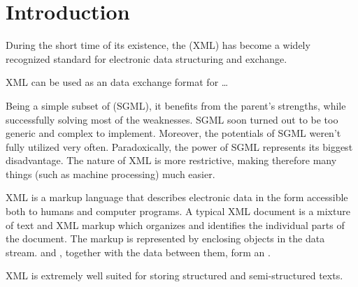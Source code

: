 \chapter{Introduction}
During the short time of its existence, the  (XML) has become a widely recognized standard for electronic data structuring and exchange.

XML can be used as an data exchange format for  \dots

Being a simple subset of  (SGML), it benefits from the parent's strengths, while successfully solving most of the weaknesses. SGML soon turned out to be too generic and complex to implement. Moreover, the potentials of SGML weren't fully utilized very often. Paradoxically, the power of SGML represents its biggest disadvantage. The nature of XML is more restrictive, making therefore many things (such as machine processing) much easier.

XML is a markup language that describes electronic data in the form accessible both to humans and computer programs. A typical XML document is a mixture of text and XML markup which organizes and identifies the individual parts of the document. The markup is represented by  enclosing objects in the data stream.  and , together with the data between them, form an .

XML is extremely well suited for storing structured and semi-structured texts.
